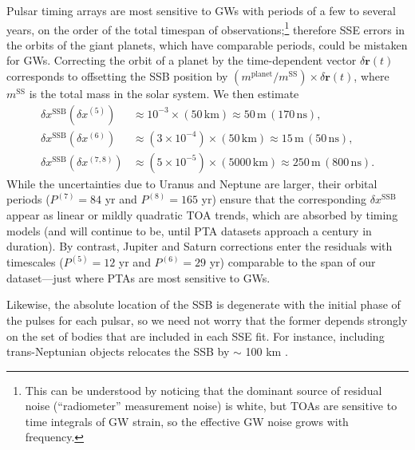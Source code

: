 \documentclass[iop,apj,twocolappendix]{emulateapj}
\begin{document}
Pulsar timing arrays are most sensitive to GWs with periods of a few to several years, on the order of the total timespan of observations;\footnote{This can be understood by noticing that the dominant source of residual noise (``radiometer'' measurement noise) is white, but TOAs are sensitive to time integrals of GW strain, so the effective GW noise grows with frequency.}
therefore SSE errors in the orbits of the giant planets, which have comparable periods, could be mistaken for GWs.
Correcting the orbit of a planet by the time-dependent vector $\delta \mathbf{r}(t)$ corresponds to offsetting the SSB position by $(m^\mathrm{planet}/m^\mathrm{SS}) \times \delta \mathbf{r}(t)$, where $m^\mathrm{SS}$ is the total mass in the solar system. We then estimate
%
\begin{equation}
    \begin{aligned}
    \delta x^\mathrm{SSB}(\delta x^{(5)}) & \approx 10^{-3} \!\times\! (50 \, \mathrm{km}) \approx 50 \, \mathrm{m} \, (170 \, \mathrm{ns}), \\
    \delta x^\mathrm{SSB}(\delta x^{(6)}) & \approx (3 \!\times\! 10^{-4}) \!\times\! (50 \, \mathrm{km}) \approx 15 \, \mathrm{m} \, (50 \, \mathrm{ns}), \\
    \delta x^\mathrm{SSB}(\delta x^{(7,8)}) & \approx (5 \!\times\! 10^{-5}) \!\times\! (5000 \, \mathrm{km}) \approx 250 \, \mathrm{m} \, (800 \, \mathrm{ns}).
    \end{aligned}
\end{equation}
%
While the uncertainties due to Uranus and Neptune are larger, their orbital periods ($P^{(7)} = 84$ yr and $P^{(8)} = 165$ yr) ensure that the corresponding $\delta x^\mathrm{SSB}$ appear as linear or mildly quadratic TOA trends, which are absorbed by timing models (and will continue to be, until PTA datasets approach a century in duration). By contrast, Jupiter and Saturn corrections enter the residuals with timescales ($P^{(5)} = 12$ yr and $P^{(6)} = 29$ yr) comparable to the span of our dataset---just where PTAs are most sensitive to GWs.

Likewise, the absolute location of the SSB is degenerate with the initial phase of the pulses for each pulsar, so we need not worry that the former depends strongly on the set of bodies that are included in each SSE fit. For instance, including trans-Neptunian objects relocates the SSB by $\sim$ 100 km \citep{2014IPNPR.196C...1F}.
\end{document}
